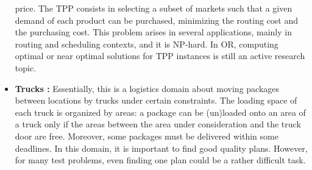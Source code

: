 \begin{itemize}
{price. The TPP consists in selecting a subset of markets such that a given
demand of each product can be purchased, minimizing the routing cost and
the purchasing cost. This problem arises in several applications, mainly
in routing and scheduling contexts, and it is NP-hard. In OR, computing
optimal or near optimal solutions for TPP instances is still an active
research topic.}
\item \textbf{Trucks :}
{\color{red}Essentially, this is a logistics domain about moving packages between
locations by trucks under certain constraints. The loading space of each
truck is organized by areas: a package can be (un)loaded onto an area of a
truck only if the areas between the area under consideration and the truck
door are free. Moreover, some packages must be delivered within some
deadlines. In this domain, it is important to find good quality plans.
However, for many test problems, even finding one plan could be a rather
difficult task.}
\end{itemize}

